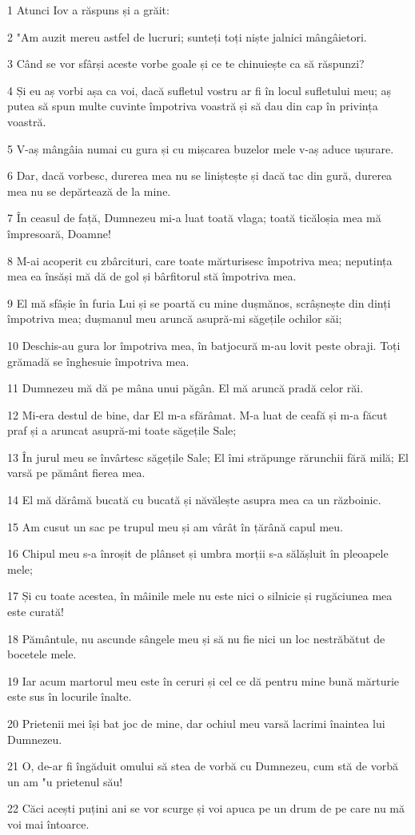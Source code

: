 \par 1 Atunci Iov a răspuns și a grăit:
\par 2 "Am auzit mereu astfel de lucruri; sunteți toți niște jalnici mângâietori.
\par 3 Când se vor sfârși aceste vorbe goale și ce te chinuiește ca să răspunzi?
\par 4 Și eu aș vorbi așa ca voi, dacă sufletul vostru ar fi în locul sufletului meu; aș putea să spun multe cuvinte împotriva voastră și să dau din cap în privința voastră.
\par 5 V-aș mângâia numai cu gura și cu mișcarea buzelor mele v-aș aduce ușurare.
\par 6 Dar, dacă vorbesc, durerea mea nu se liniștește și dacă tac din gură, durerea mea nu se depărtează de la mine.
\par 7 În ceasul de față, Dumnezeu mi-a luat toată vlaga; toată ticăloșia mea mă împresoară, Doamne!
\par 8 M-ai acoperit cu zbârcituri, care toate mărturisesc împotriva mea; neputința mea ea însăși mă dă de gol și bârfitorul stă împotriva mea.
\par 9 El mă sfâșie în furia Lui și se poartă cu mine dușmănos, scrâșnește din dinți împotriva mea; dușmanul meu aruncă asupră-mi săgețile ochilor săi;
\par 10 Deschis-au gura lor împotriva mea, în batjocură m-au lovit peste obraji. Toți grămadă se înghesuie împotriva mea.
\par 11 Dumnezeu mă dă pe mâna unui păgân. El mă aruncă pradă celor răi.
\par 12 Mi-era destul de bine, dar El m-a sfărâmat. M-a luat de ceafă și m-a făcut praf și a aruncat asupră-mi toate săgețile Sale;
\par 13 În jurul meu se învârtesc săgețile Sale; El îmi străpunge rărunchii fără milă; El varsă pe pământ fierea mea.
\par 14 El mă dărâmă bucată cu bucată și năvălește asupra mea ca un războinic.
\par 15 Am cusut un sac pe trupul meu și am vârât în țărână capul meu.
\par 16 Chipul meu s-a înroșit de plânset și umbra morții s-a sălășluit în pleoapele mele;
\par 17 Și cu toate acestea, în mâinile mele nu este nici o silnicie și rugăciunea mea este curată!
\par 18 Pământule, nu ascunde sângele meu și să nu fie nici un loc nestrăbătut de bocetele mele.
\par 19 Iar acum martorul meu este în ceruri și cel ce dă pentru mine bună mărturie este sus în locurile înalte.
\par 20 Prietenii mei își bat joc de mine, dar ochiul meu varsă lacrimi înaintea lui Dumnezeu.
\par 21 O, de-ar fi îngăduit omului să stea de vorbă cu Dumnezeu, cum stă de vorbă un am "u prietenul său!
\par 22 Căci acești puțini ani se vor scurge și voi apuca pe un drum de pe care nu mă voi mai întoarce.

